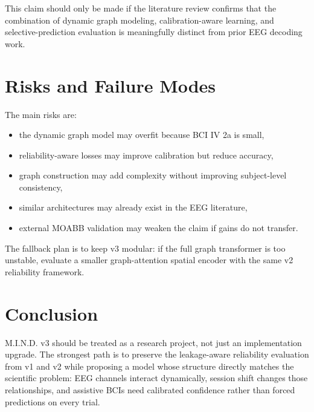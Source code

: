 \documentclass[11pt]{article}
\begin{document}
This claim should only be made if the literature review confirms that the
combination of dynamic graph modeling, calibration-aware learning, and
selective-prediction evaluation is meaningfully distinct from prior EEG
decoding work.

\section{Risks and Failure Modes}

The main risks are:
\begin{itemize}
  \item the dynamic graph model may overfit because BCI IV 2a is small,
  \item reliability-aware losses may improve calibration but reduce accuracy,
  \item graph construction may add complexity without improving subject-level
  consistency,
  \item similar architectures may already exist in the EEG literature,
  \item external MOABB validation may weaken the claim if gains do not
  transfer.
\end{itemize}

The fallback plan is to keep v3 modular: if the full graph transformer is too
unstable, evaluate a smaller graph-attention spatial encoder with the same
v2 reliability framework.

\section{Conclusion}

M.I.N.D. v3 should be treated as a research project, not just an implementation
upgrade. The strongest path is to preserve the leakage-aware reliability
evaluation from v1 and v2 while proposing a model whose structure directly
matches the scientific problem: EEG channels interact dynamically, session
shift changes those relationships, and assistive BCIs need calibrated
confidence rather than forced predictions on every trial.
\end{document}
